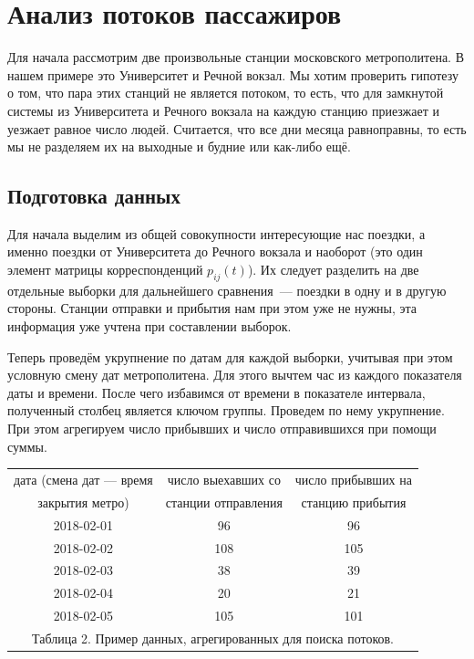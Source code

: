\documentclass[12pt, fleqn, titlepage]{article}
\begin{document}
    \section{Анализ потоков пассажиров}

    Для начала рассмотрим две произвольные станции московского метрополитена. В нашем примере это Университет и Речной вокзал. 
    Мы хотим проверить гипотезу о том, что пара этих станций не является потоком, 
    то есть, что для замкнутой системы из Университета и Речного вокзала на каждую станцию приезжает и уезжает равное число людей. 
    Считается, что все дни месяца равноправны, то есть мы не разделяем их 
    на выходные и будние или как-либо ещё.

    \subsection{Подготовка данных}

    Для начала выделим из общей совокупности интересующие нас поездки, а именно поездки от 
    Университета до Речного вокзала и наоборот (это один элемент матрицы корреспонденций $p_{ij}(t)$). 
    Их следует разделить на две отдельные выборки 
    для дальнейшего сравнения~--- поездки в одну и в другую стороны. 
    Станции отправки и прибытия нам при этом уже не нужны, эта информация уже учтена при составлении выборок.

    Теперь проведём укрупнение по датам для каждой выборки, учитывая при этом условную смену 
    дат метрополитена. Для этого вычтем час из каждого показателя даты и времени. 
    После чего избавимся от времени в показателе интервала, полученный столбец является ключом группы. 
    Проведем по нему укрупнение. При этом агрегируем число прибывших и число отправившихся при помощи суммы.

    \begin{center}
    \begin{tabular}{ |c|c|c| } 
    
        \hline
        дата (смена дат — время & число выехавших со & число прибывших на \\
        закрытия метро) & станции отправления & станцию прибытия \\
        \hline
        2018-02-01 & 96 & 96 \\
        2018-02-02 & 108 & 105 \\
        2018-02-03 & 38 & 39 \\
        2018-02-04 & 20 & 21 \\
        2018-02-05 & 105 & 101 \\
        \hline
        \multicolumn{3}{c}{\footnotesize Таблица 2.
        Пример данных, агрегированных для поиска потоков.} \\
    
    \end{tabular}
    \end{center}
\end{document}
